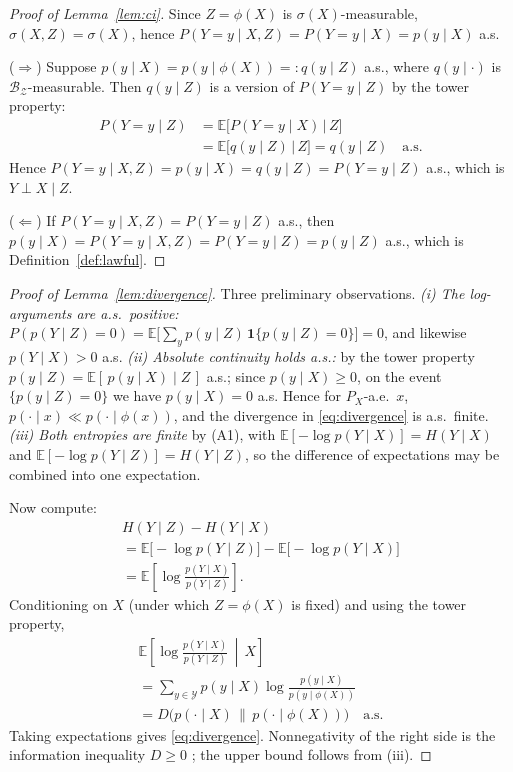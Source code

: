 \documentclass[twocolumn,10pt]{article}
\theoremstyle{definition}
\theoremstyle{remark}
\newcommand{\E}{\mathbb{E}}
\newcommand{\cY}{\mathcal{Y}}
\newcommand{\cZ}{\mathcal{Z}}
\begin{document}
\begin{proof}[Proof of Lemma~\ref{lem:ci}]
Since $Z = \phi(X)$ is $\sigma(X)$-measurable, $\sigma(X, Z) = \sigma(X)$,
hence $P(Y = y \mid X, Z) = P(Y = y \mid X) = p(y \mid X)$ a.s.

($\Rightarrow$) Suppose $p(y \mid X) = p(y \mid \phi(X)) =: q(y \mid Z)$
a.s., where $q(y \mid \cdot)$ is $\mathcal B_{\cZ}$-measurable. Then
$q(y \mid Z)$ is a version of $P(Y = y \mid Z)$ by the tower property:
\begin{align*}
P(Y = y \mid Z)
&= \E\big[P(Y = y \mid X) \,\big|\, Z\big] \\
&= \E\big[q(y \mid Z) \,\big|\, Z\big]
= q(y \mid Z) \quad \text{a.s.}
\end{align*}
Hence $P(Y = y \mid X, Z) = p(y \mid X) = q(y \mid Z) = P(Y = y \mid Z)$
a.s., which is $Y \perp X \mid Z$.

($\Leftarrow$) If $P(Y = y \mid X, Z) = P(Y = y \mid Z)$ a.s., then
$p(y \mid X) = P(Y = y \mid X, Z) = P(Y = y \mid Z) = p(y \mid Z)$ a.s.,
which is Definition~\ref{def:lawful}.
\end{proof}

\begin{proof}[Proof of Lemma~\ref{lem:divergence}]
Three preliminary observations. \emph{(i) The log-arguments are a.s.\
positive:} $P(p(Y \mid Z) = 0) = \E\big[\sum_y p(y \mid Z)\,
\mathbf{1}\{p(y \mid Z) = 0\}\big] = 0$, and likewise $p(Y \mid X) > 0$
a.s. \emph{(ii) Absolute continuity holds a.s.:} by the tower property
$p(y \mid Z) = \E[\,p(y \mid X) \mid Z\,]$ a.s.; since $p(y \mid X) \ge 0$,
on the event $\{p(y \mid Z) = 0\}$ we have $p(y \mid X) = 0$ a.s. Hence for
$P_X$-a.e.\ $x$, $p(\cdot \mid x) \ll p(\cdot \mid \phi(x))$, and the
divergence in \eqref{eq:divergence} is a.s.\ finite. \emph{(iii) Both
entropies are finite} by (A1), with
$\E[-\log p(Y \mid X)] = H(Y \mid X)$ and
$\E[-\log p(Y \mid Z)] = H(Y \mid Z)$, so the difference of expectations may
be combined into one expectation.

Now compute:
\begin{multline*}
H(Y \mid Z) - H(Y \mid X) \\
= \E\big[-\log p(Y \mid Z)\big] - \E\big[-\log p(Y \mid X)\big] \\
= \E\left[\log \frac{p(Y \mid X)}{p(Y \mid Z)}\right].
\end{multline*}
Conditioning on $X$ (under which $Z = \phi(X)$ is fixed) and using the
tower property,
\begin{multline*}
\E\left[\log \frac{p(Y \mid X)}{p(Y \mid Z)} \,\middle|\, X\right] \\
= \sum_{y \in \cY} p(y \mid X)
  \log \frac{p(y \mid X)}{p(y \mid \phi(X))} \\
= D\big(p(\cdot \mid X) \,\big\|\, p(\cdot \mid \phi(X))\big)
\quad \text{a.s.}
\end{multline*}
Taking expectations gives \eqref{eq:divergence}. Nonnegativity of the right
side is the information inequality $D \ge 0$ \cite[Thm.~2.6.3]{coverthomas};
the upper bound follows from (iii).
\end{proof}
\end{document}
